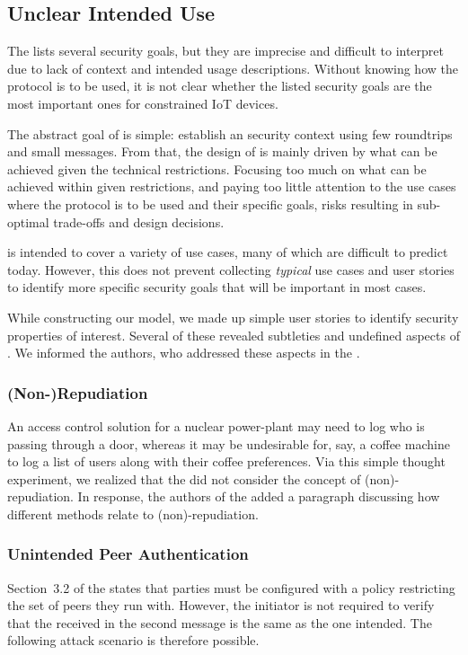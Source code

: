 \documentclass[runningheads]{llncs}
\begin{document}
\subsection{Unclear Intended Use}
\label{sec:unclearProtocolUse}
%
The \mEdhoc{} \mSpec{} lists several security goals, but they are
imprecise and difficult to interpret due to lack of context and intended usage
descriptions.
%
Without knowing how the protocol is to be used,
it is not clear whether the listed security goals are the most important ones
for constrained IoT devices.
%

The abstract goal of \mEdhoc{} is simple: establish an \mOscore{} security
context using few roundtrips and small messages.
%
From that, the design of \mEdhoc{} is mainly driven by what
can be achieved given the technical restrictions.
%
Focusing too much on what can be achieved within given restrictions, and paying
too little attention to the use cases where the
protocol is to be used and their specific goals, risks resulting in
sub-optimal trade-offs and design decisions.
%

\mEdhoc{} is intended to cover a variety of use cases, many of which are
difficult to predict today.
%
However, this does not
prevent collecting \emph{typical} use cases and user stories
to identify more specific security goals that will be important in most cases.
%

While constructing our model, we made up simple user stories to identify
security properties of interest.
%
Several of these revealed subtleties and undefined aspects of \mEdhoc{}.
%
We informed the \mEdhoc{} authors, who addressed these aspects in the
\mSpec{}.
%

\subsubsection{(Non-)Repudiation}
An access control solution for a nuclear power-plant may need to log who is
passing through a door, whereas it may be undesirable for, say, a coffee
machine to log a list of users along with their coffee preferences.
%
Via this simple thought experiment, we realized that the \mSpec{} did not
consider the concept of (non)-repudiation.
%
In response, the authors of the \mSpec{} added a paragraph discussing how
different methods relate to (non)-repudiation.

\subsubsection{Unintended Peer Authentication}
Section~3.2 of the \mSpec{} states that parties must be configured
with a policy restricting the set of peers they run \mEdhoc{} with.
%
However, the initiator is not required to verify that the \mIdcredr{} received
in the second message is the same as the one intended.
%
The following attack scenario is therefore possible.
%
\end{document}
